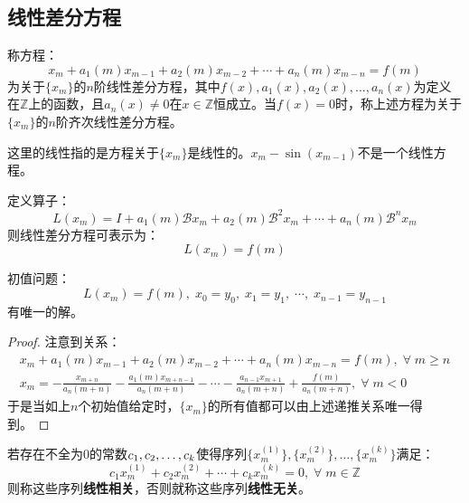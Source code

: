 \subsection{线性差分方程}
\begin{definition}
	称方程：
	\begin{equation*}
		x_m+a_1(m)x_{m-1}+a_2(m)x_{m-2}+\cdots+a_n(m)x_{m-n}=f(m)
	\end{equation*}
	为关于$\{x_m\}$的$n$阶线性差分方程，其中$f(x),a_1(x),a_2(x),\dots,a_n(x)$为定义在$\mathbb{Z}$上的函数，且$a_n(x)\ne0$在$x\in\mathbb{Z}$恒成立。当$f(x)=0$时，称上述方程为关于$\{x_m\}$的$n$阶齐次线性差分方程。
\end{definition}
\begin{note}
	这里的线性指的是方程关于$\{x_m\}$是线性的。$x_m-\sin(x_{m-1})$不是一个线性方程。
\end{note}
\begin{derivation}
	定义算子：
	\begin{equation*}
		L(x_m)=I+a_1(m)\mathcal{B}x_m+a_2(m)\mathcal{B}^2x_m+\cdots+a_n(m)\mathcal{B}^nx_m
	\end{equation*}
	则线性差分方程可表示为：
	\begin{equation*}
		L(x_m)=f(m)
	\end{equation*}
\end{derivation}
\begin{theorem}\label{theo:LinearDifferenceEqExistenceUniqueness}
	初值问题：
	\begin{equation*}
		L(x_m)=f(m),\;x_0=y_0,\;x_1=y_1,\;\cdots,\;x_{n-1}=y_{n-1}
	\end{equation*}
	有唯一的解。
\end{theorem}
\begin{proof}
	注意到关系：
	\begin{gather*}
		x_m+a_1(m)x_{m-1}+a_2(m)x_{m-2}+\cdots+a_n(m)x_{m-n}=f(m),\;\forall\;m\geqslant n \\
		x_{m}=-\frac{x_{m+n}}{a_n(m+n)}-\frac{a_1(m)x_{m+n-1}}{a_n(m+n)}-\cdots-\frac{a_{n-1}x_{m+1}}{a_n(m+n)}+\frac{f(m)}{a_n(m+n)},\;\forall\;m<0
	\end{gather*}
	于是当如上$n$个初始值给定时，$\{x_m\}$的所有值都可以由上述递推关系唯一得到。
\end{proof}
\begin{definition}
	若存在不全为$0$的常数$c_1, c_2, \dots, c_{k}$使得序列$\{x_m^{(1)}\},\{x_m^{(2)}\},\dots,\{x_m^{(k)}\}$满足：
	\begin{equation*}
		c_1x_m^{(1)}+c_2x_m^{(2)}+\cdots+c_kx_m^{(k)}=0,\;\forall\;m\in\mathbb{Z}
	\end{equation*}
	则称这些序列\textbf{线性相关}，否则就称这些序列\textbf{线性无关}。
\end{definition}
